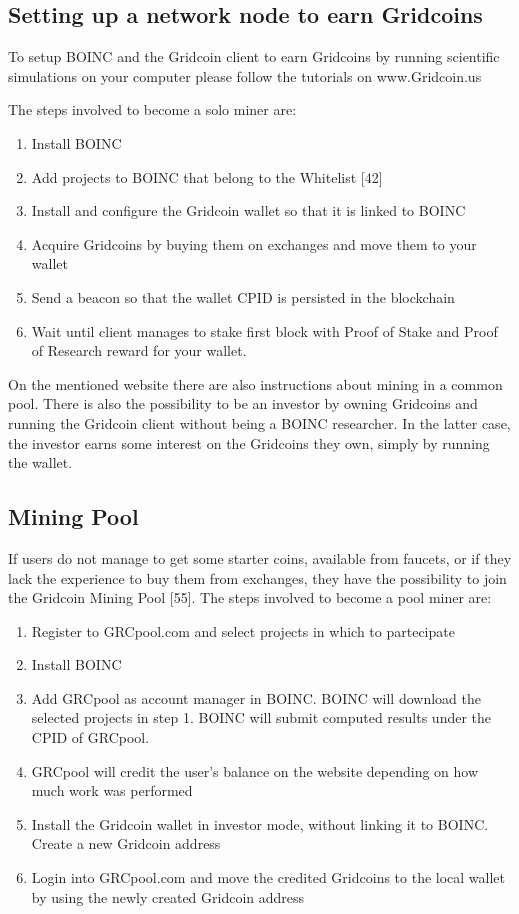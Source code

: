\subsection{Setting up a network node to earn Gridcoins}

To setup BOINC and the Gridcoin client to earn Gridcoins by running scientific simulations on your computer please follow the tutorials on www.Gridcoin.us

The steps involved to become a solo miner are:
\begin{enumerate}
  \item Install BOINC
  \item Add projects to BOINC that belong to the Whitelist [42]
  \item Install and configure the Gridcoin wallet so that it is linked to BOINC 
  \item Acquire Gridcoins by buying them on exchanges and move them to your wallet
  \item Send a beacon so that the wallet CPID is persisted in the blockchain
  \item Wait until client manages to stake first block with Proof of Stake and Proof of Research reward for your wallet.
\end{enumerate}

On the mentioned website there are also instructions about mining in a common pool. There is also the possibility to be an investor by owning Gridcoins and running the Gridcoin client without being a BOINC researcher. In the latter case, the investor earns some interest on the Gridcoins they own, simply by running the wallet.\\

\subsection{Mining Pool}

If users do not manage to get some starter coins, available from faucets, or if they lack the experience to buy them from exchanges, they have the possibility to join the Gridcoin Mining Pool [55]. The steps involved to become a pool miner are:

\begin{enumerate}
  \item Register to GRCpool.com and select projects in which to partecipate
  \item Install BOINC
  \item Add GRCpool as account manager in BOINC. BOINC will download the selected projects in step 1. BOINC will submit computed results under the CPID of GRCpool.
  \item GRCpool will credit the user's balance on the website depending on how much work was performed 
  \item Install the Gridcoin wallet in investor mode, without linking it to BOINC. Create a new Gridcoin address 
  \item Login into GRCpool.com and move the credited Gridcoins to the local wallet by using the newly created Gridcoin address
\end{enumerate}

